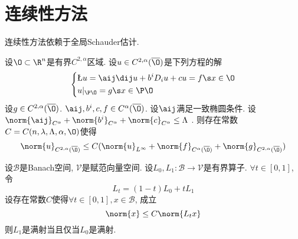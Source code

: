 \section{连续性方法}
连续性方法依赖于全局Schauder估计. 
\begin{theorem}
    设$\O \subset \R^n$是有界$C^{2,\alpha}$区域. 设$u \in C^{2,\alpha}(\overline{\O})$是下列方程的解
    \begin{equation}
        \left\{
        \begin{aligned}
            &\L u=\aij \dij u + b^iD_iu+cu=f \s x \in \O \\
            &u|_{\P \O}=g \s x \in \P \O
        \end{aligned}
        \right.
    \end{equation}
    设$g \in C^{2,\alpha}(\overline{\O})$. $\aij, b^i, c, f \in C^\alpha(\overline{\O})$. 设$\aij$满足一致椭圆条件. 设$\norm{\aij}_{C^\alpha}+\norm{b^i}_{C^\alpha}+\norm{c}_{C^\alpha} \le \Lambda$ . 则存在常数$C=C(n,\lambda,\Lambda,\alpha,\O)$使得
    \begin{equation}
        \norm{u}_{C^{2,\alpha}(\overline{\O})} \le C(\norm{u}_{L^\infty}+ \norm{f}_{C^\alpha(\overline{\O})}+\norm{g}_{C^{2,\alpha}(\overline{\O})})
    \end{equation}
\end{theorem}
\renewcommand{\B}{\mathcal{B}}
\renewcommand{\V}{\mathcal{V}}
\begin{theorem}\label{function_a_continuous}
    设$\B$是Banach空间, $\V$是赋范向量空间. 设$L_0, L_1: \B\to \V$是有界算子. $\forall t \in [0,1]$, 令
    \begin{equation}
        L_t=(1-t)L_0+tL_1
    \end{equation}
    设存在常数$C$使得$\forall t \in [0,1], x \in \B$, 成立
    \begin{equation}
        \norm{x} \le C\norm{L_tx}
    \end{equation}
    则$L_1$是满射当且仅当$L_0$是满射.
\end{theorem}
